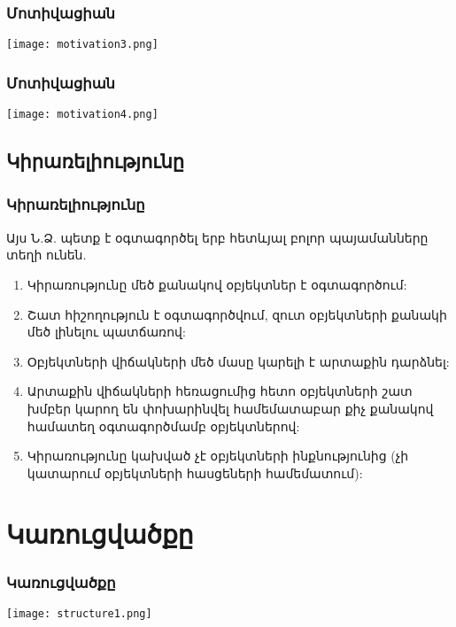 \documentclass{beamer}
\begin{document}
\begin{frame}\frametitle{Մոտիվացիան}
\begin{center}
    \texttt{[image: motivation3.png]}
\end{center}
\end{frame}

\begin{frame}\frametitle{Մոտիվացիան}
\begin{center}
    \texttt{[image: motivation4.png]}
\end{center}
\end{frame}

\subsection{Կիրառելիությունը}
\begin{frame}\frametitle{Կիրառելիությունը}
Այս Ն.Ձ. պետք է օգտագործել երբ հետևյալ բոլոր պայամանները տեղի ունեն.
\vfill
{}
\begin{enumerate}
    \item Կիրառությունը մեծ քանակով օբյեկտներ է օգտագործում: \vfill
    \item Շատ հիշողություն  է օգտագործվում, զուտ օբյեկտների քանակի մեծ
    լինելու պատճառով: \vfill
    \item Օբյեկտների վիճակների մեծ մասը կարելի է արտաքին դարձնել: \vfill
    \item Արտաքին վիճակների հեռացումից հետո օբյեկտների շատ խմբեր կարող են
    փոխարինվել համեմատաբար քիչ քանակով համատեղ օգտագործմամբ օբյեկտներով: \vfill
    \item Կիրառությունը կախված չէ օբյեկտների ինքնությունից (չի կատարում օբյեկտների
    հասցեների համեմատում):
\end{enumerate}
\end{frame}

\section{Կառուցվածքը}
\begin{frame}\frametitle{Կառուցվածքը}
\begin{center}
    \texttt{[image: structure1.png]}
\end{center}
\end{frame}
\end{document}
